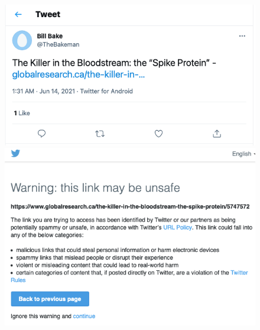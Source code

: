 \documentclass[11pt,a4paper]{article}
\begin{document}
\begin{figure}
\centering	
	\begin{multicols}{1}
		\includegraphics[scale=0.35]{./img/globalresearch/tweet.png} 
		\includegraphics[scale=0.35]{./img/globalresearch/warning.png}
	\end{multicols}
\caption{}
\label{fig4bis}
\end{figure}
\end{document}
